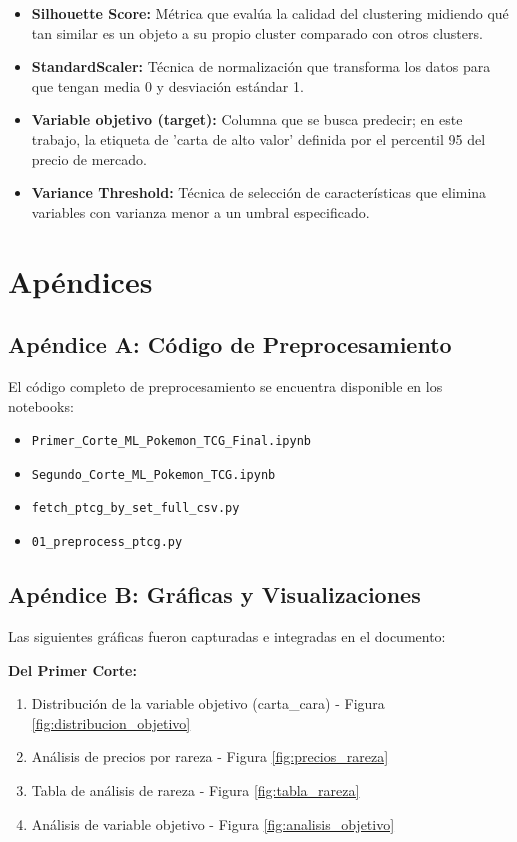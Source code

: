 \documentclass[12pt,letterpaper]{article}
\begin{document}
\begin{itemize}
    \item \textbf{Silhouette Score:} Métrica que evalúa la calidad del clustering midiendo qué tan similar es un objeto a su propio cluster comparado con otros clusters.
    
    \item \textbf{StandardScaler:} Técnica de normalización que transforma los datos para que tengan media 0 y desviación estándar 1.
    
    \item \textbf{Variable objetivo (target):} Columna que se busca predecir; en este trabajo, la etiqueta de 'carta de alto valor' definida por el percentil 95 del precio de mercado.
    
    \item \textbf{Variance Threshold:} Técnica de selección de características que elimina variables con varianza menor a un umbral especificado.
\end{itemize}

\newpage

\section{Apéndices}

\subsection{Apéndice A: Código de Preprocesamiento}

El código completo de preprocesamiento se encuentra disponible en los notebooks:
\begin{itemize}
    \item \texttt{Primer\_Corte\_ML\_Pokemon\_TCG\_Final.ipynb}
    \item \texttt{Segundo\_Corte\_ML\_Pokemon\_TCG.ipynb}
    \item \texttt{fetch\_ptcg\_by\_set\_full\_csv.py}
    \item \texttt{01\_preprocess\_ptcg.py}
\end{itemize}

\subsection{Apéndice B: Gráficas y Visualizaciones}

Las siguientes gráficas fueron capturadas e integradas en el documento:

\textbf{Del Primer Corte:}
\begin{enumerate}
    \item Distribución de la variable objetivo (carta\_cara) - Figura \ref{fig:distribucion_objetivo}
    \item Análisis de precios por rareza - Figura \ref{fig:precios_rareza}
    \item Tabla de análisis de rareza - Figura \ref{fig:tabla_rareza}
    \item Análisis de variable objetivo - Figura \ref{fig:analisis_objetivo}
\end{enumerate}
\end{document}
